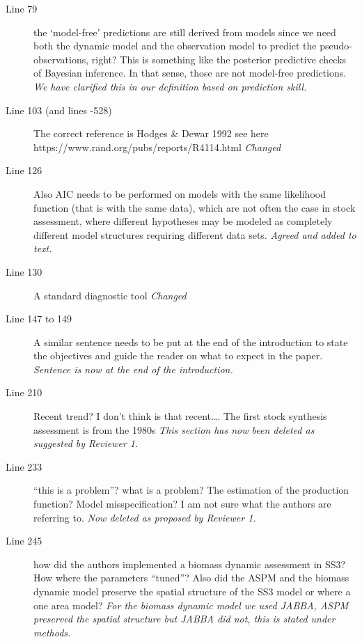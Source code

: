 \begin{itemize}
\begin{description}
\item[Line 79] the ‘model-free’ predictions are still derived from models since we need both the dynamic model and the observation model to predict the pseudo-observations, right? This is something like the posterior predictive checks of Bayesian inference. In that sense, those are not model-free predictions. 
\textit{\newline We have clarified this in our definition based on prediction skill.}

\item[Line 103 (and lines  -528)] The correct reference is Hodges \& Dewar 1992 see here https://www.rand.org/pubs/reports/R4114.html
\textit{\newline Changed}

\item[Line 126] Also AIC needs to be performed on models with the same likelihood function (that is with the same data), which are not often the case in stock assessment, where different hypotheses may be modeled as completely different model structures requiring different data sets.
\textit{\newline Agreed and added to text.}

\item[Line 130] A standard diagnostic tool 
\textit{\newline Changed}

\item[Line 147 to 149] A similar sentence needs to be put at the end of the introduction to state the objectives and guide the reader on what to expect in the paper.
\textit{\newline Sentence is now at the end of the introduction.}

\item[Line 210] Recent trend? I don’t think is that recent…. The first stock synthesis assessment is from the 1980s
\textit{\newline This section has now been deleted as suggested by Reviewer 1.}


\item[Line 233] “this is a problem”? what is a problem? The estimation of the production function? Model misspecification? I am not sure what the authors are referring to. 
\textit{\newline Now deleted as proposed by Reviewer 1.}

\item[Line 245] how did the authors implemented a biomass dynamic assessment in SS3? How where the parameters “tuned”? Also did the ASPM and the biomass dynamic model preserve the spatial structure of the SS3 model or where a one area model? 
\textit{\newline For the biomass dynamic model we used JABBA, ASPM preserved the spatial structure but JABBA did not, this is stated under methods.}


\end{description}
\end{itemize}
